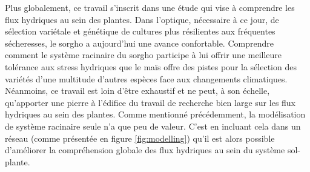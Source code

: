 Plus globalement, ce travail s'inscrit dans une étude qui vise à comprendre les flux hydriques au sein des plantes.
Dans l'optique, nécessaire à ce jour, de sélection variétale et génétique de cultures plus résilientes aux fréquentes sécheresses, le sorgho a aujourd'hui une avance confortable.
Comprendre comment le système racinaire du sorgho participe à lui offrir une meilleure tolérance aux stress hydriques que le maïs offre des pistes pour la sélection des variétés d'une multitude d'autres espèces face aux changements climatiques.
Néanmoins, ce travail est loin d'être exhaustif et ne peut, à son échelle, qu'apporter une pierre à l'édifice du travail de recherche bien large sur les flux hydriques au sein des plantes. 
Comme mentionné précédemment, la modélisation de système racinaire seule n'a que peu de valeur.
C'est en incluant cela dans un réseau (comme présentée en figure \ref{fig:modelling}) qu'il est alors possible d'améliorer la compréhension globale des flux hydriques au sein du système sol-plante.